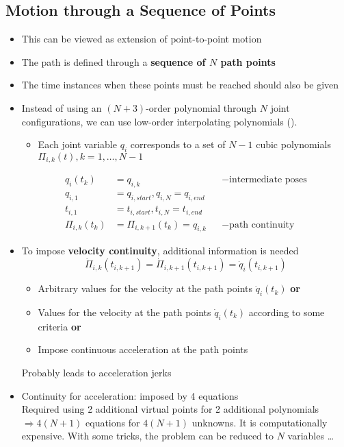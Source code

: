\subsection{Motion through a Sequence of Points}
\begin{itemize}
	\item This can be viewed as extension of point-to-point motion
	\item The path is defined through a \textbf{sequence of $N$ path points}
	\item The time instances when these points must be reached should also be given
	\item Instead of using an $(N+3)$-order polynomial through $N$ joint configurations, we can use low-order interpolating polynomials ().
	\begin{itemize}
		\item Each joint variable $q_i$ corresponds to a set of $N-1$ cubic polynomials $\Pi_{i,k}(t), k=1, \dots, N-1$
	\end{itemize}
	\begin{align*}
		q_i(t_k) &= q_{i,k} &&-\text{intermediate poses}\\
		q_{i,1} &= q_{i,start}, q_{i,N} = q_{i,end}\\
		t_{i,1} &= t_{i,start}, t_{i,N} = t_{i,end}\\
		\Pi_{i,k}(t_k) &= \Pi_{i,k+1}(t_k) = q_{i,k} &&-\text{path continuity}
	\end{align*}
	\item To impose \textbf{velocity continuity}, additional information is needed
	\[ \dot{\Pi}_{i,k}(t_{i,k+1}) = \dot{\Pi}_{i,k+1}(t_{i,k+1}) = \dot{q}_i(t_{i,k+1}) \]
	\begin{itemize}
		\item Arbitrary values for the velocity at the path points $\dot{q}_i(t_k)$ \textbf{or}
		\item Values for the velocity at the path points $\dot{q}_i(t_k)$ according to some criteria \textbf{or}
		\item Impose continuous acceleration at the path points
	\end{itemize}
	\note Probably leads to acceleration jerks
	\item Continuity for acceleration: imposed by 4 equations\\
	\note Required using 2 additional virtual points for 2 additional polynomials $\Rightarrow 4(N+1)$ equations for $4(N+1)$ unknowns. It is computationally expensive. With some tricks, the problem can be reduced to $N$ variables \dots
\end{itemize}

